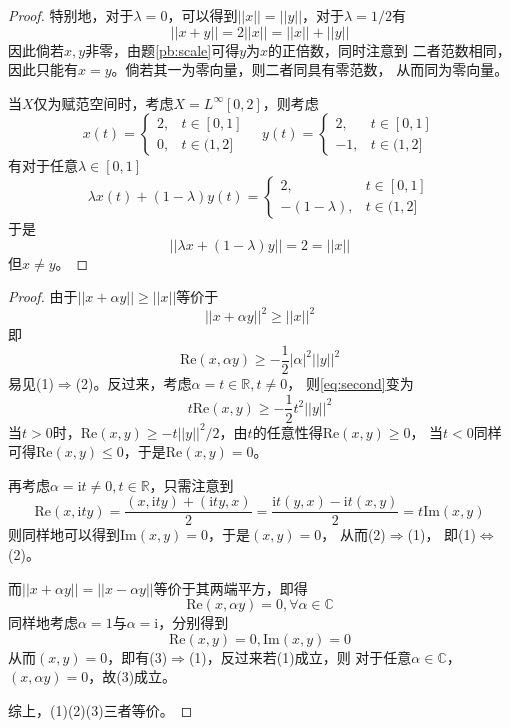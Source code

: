 \documentclass[cn]{homework}
\newcommand{\re}{\mathrm{Re}}
\newcommand{\im}{\mathrm{Im}}
\newcommand{\img}{\mathrm i}
\begin{document}
    \problem
    \begin{proof}
        特别地，对于$\lambda=0$，可以得到$||x||=||y||$，对于$\lambda=1/2$有
        \[||x+y||=2||x||=||x||+||y||\]
        因此倘若$x,y$非零，由题\ref{pb:scale}可得$y$为$x$的正倍数，同时注意到
        二者范数相同，因此只能有$x=y$。倘若其一为零向量，则二者同具有零范数，
        从而同为零向量。

        当$X$仅为赋范空间时，考虑$X=L^\infty[0,2]$，则考虑
        \[x(t)=\begin{cases}
            2,&t\in[0,1]\\
            0,&t\in(1,2]
        \end{cases}
        \quad
        y(t)=\begin{cases}
            2,&t\in[0,1]\\
            -1,&t\in(1,2]
        \end{cases}\]
        有对于任意$\lambda\in[0,1]$
        \[\lambda x(t)+(1-\lambda)y(t)=\begin{cases}
            2,&t\in[0,1]\\
            -(1-\lambda),&t\in (1,2]
        \end{cases}\]
        于是
        \[||\lambda x+(1-\lambda)y||=2=||x||\]
        但$x\neq y$。
    \end{proof}

    \problem
    \begin{proof}
        由于$||x+\alpha y||\geq ||x||$等价于
        \[||x+\alpha y||^2\geq ||x||^2\]
        即
        \begin{equation}
            \label{eq:second}
            \re(x,\alpha y)\geq -\frac{1}{2}|\alpha|^2||y||^2
        \end{equation}
        易见(1)$\Rightarrow$(2)。反过来，考虑$\alpha=t\in\mathbb R,t\neq 0$，
        则\cref{eq:second}变为
        \[t\re(x,y)\geq -\frac{1}{2}t^2||y||^2\]
        当$t>0$时，$\re(x,y)\geq -t||y||^2/2$，由$t$的任意性得$\re(x,y)\geq 0$，
        当$t<0$同样可得$\re(x,y)\leq 0$，于是$\re(x,y)=0$。

        再考虑$\alpha=\img t\neq 0,t\in\mathbb R$，只需注意到
        \[\re(x,\img ty)
        =\frac{(x,\img ty)+(\img ty,x)}{2}
        =\frac{\img t(y,x)-\img t(x,y)}{2}
        =t\im(x,y)\]
        则同样地可以得到$\im(x,y)=0$，于是$(x,y)=0$，
        从而(2)$\Rightarrow$(1)，
        即(1)$\Leftrightarrow$(2)。

        而$||x+\alpha y||=||x-\alpha y||$等价于其两端平方，即得
        \[\re(x,\alpha y)=0,\forall \alpha\in\mathbb C\]
        同样地考虑$\alpha=1$与$\alpha=\img$，分别得到
        \[\re(x,y)=0,\im(x,y)=0\]
        从而$(x,y)=0$，即有(3)$\Rightarrow$(1)，反过来若(1)成立，则
        对于任意$\alpha\in\mathbb C$，$(x,\alpha y)=0$，故(3)成立。

        综上，(1)(2)(3)三者等价。
    \end{proof}
\end{document}
